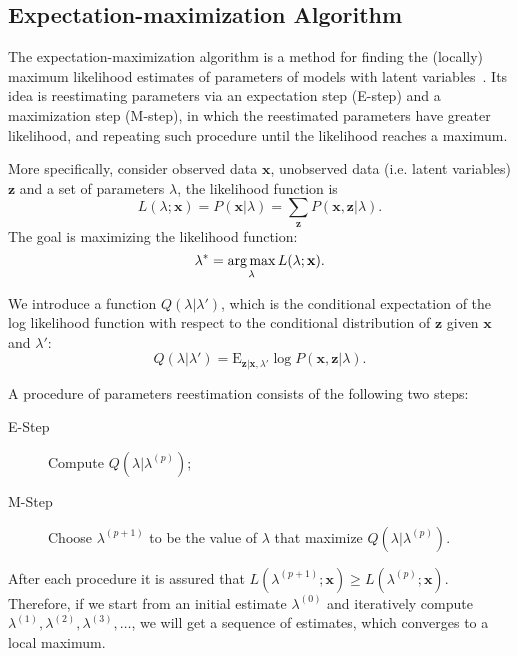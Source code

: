 \documentclass[12pt,final,twoside]{report}
\begin{document}
\subsection{Expectation-maximization Algorithm}
The expectation-maximization algorithm is a method for finding the (locally) maximum likelihood estimates of parameters of models with latent variables~\cite{dempster_maximum_1977}. Its idea is reestimating parameters via an expectation step (E-step) and a maximization step (M-step), in which the reestimated parameters have greater likelihood, and repeating such procedure until the likelihood reaches a maximum.

More specifically, consider observed data $\mathbf{x}$, unobserved data (i.e. latent variables) $\mathbf{z}$ and a set of parameters $\lambda$, the likelihood function is
\begin{equation}
  L(\lambda;\mathbf{x}) = P(\mathbf{x}|\lambda) = \sum_{\mathbf{z}} P(\mathbf{x},\mathbf{z}|\lambda) .
\end{equation}
The goal is maximizing the likelihood function:
\begin{equation}
  \lambda^* = \operatorname*{arg\,max}_\lambda L(\lambda;\mathbf{x}).
\end{equation}

We introduce a function $Q(\lambda|\lambda')$, which is the conditional expectation of the log likelihood function with respect to the conditional distribution of $\mathbf{z}$ given $\mathbf{x}$ and $\lambda'$:
\begin{equation}
  Q(\lambda|\lambda') = \text{E}_{\mathbf{z}|\mathbf{x},\lambda'} \log P(\mathbf{x},\mathbf{z}|\lambda) .
\end{equation}

A procedure of parameters reestimation consists of the following two steps:
\begin{description}
  \item[E-Step] Compute $Q(\lambda|\lambda^{(p)})$;
  \item[M-Step] Choose $\lambda^{(p+1)}$ to be the value of $\lambda$ that maximize $Q(\lambda|\lambda^{(p)})$.
\end{description}

After each procedure it is assured that $L(\lambda^{(p+1)};\mathbf{x}) \geq L(\lambda^{(p)};\mathbf{x})$. Therefore, if we start from an initial estimate $\lambda^{(0)}$ and iteratively compute $\lambda^{(1)},\lambda^{(2)},\lambda^{(3)},\dots$, we will get a sequence of estimates, which converges to a local maximum.
\end{document}
